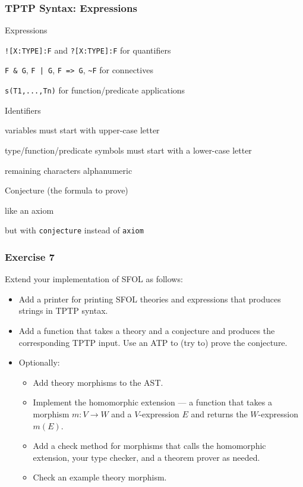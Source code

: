\begin{frame}[fragile]\frametitle{TPTP Syntax: Expressions}
\begin{blockitems}{Expressions}
\item \lstinline|![X:TYPE]:F| and \lstinline|?[X:TYPE]:F| for quantifiers
\item \lstinline!F & G!, \lstinline!F | G!, \lstinline!F => G!, \lstinline!~F! for connectives
\item \lstinline|s(T1,...,Tn)| for function/predicate applications
\end{blockitems}

\begin{blockitems}{Identifiers}
\item variables must start with upper-case letter
\item type/function/predicate symbols must start with a lower-case letter
\item remaining characters alphanumeric
\end{blockitems}

\begin{blockitems}{Conjecture (the formula to prove)}
\item like an axiom
\item but with \lstinline|conjecture| instead of \lstinline|axiom|
\end{blockitems}
\end{frame}

\begin{frame}\frametitle{Exercise 7}
Extend your implementation of SFOL as follows:
\begin{itemize}
\item Add a printer for printing SFOL theories and expressions that produces strings in TPTP syntax.
\item Add a function that takes a theory and a conjecture and produces the corresponding TPTP input. Use an ATP to (try to) prove the conjecture.
\item Optionally:
\begin{itemize}
 \item Add theory morphisms to the AST.
 \item Implement the homomorphic extension --- a function that takes a morphism $m:V\to W$ and a $V$-expression $E$ and returns the $W$-expression $m(E)$.
 \item Add a check method for morphisms that calls the homomorphic extension, your type checker, and a theorem prover as needed.
 \item Check an example theory morphism.
\end{itemize}
\end{itemize}
\end{frame}
